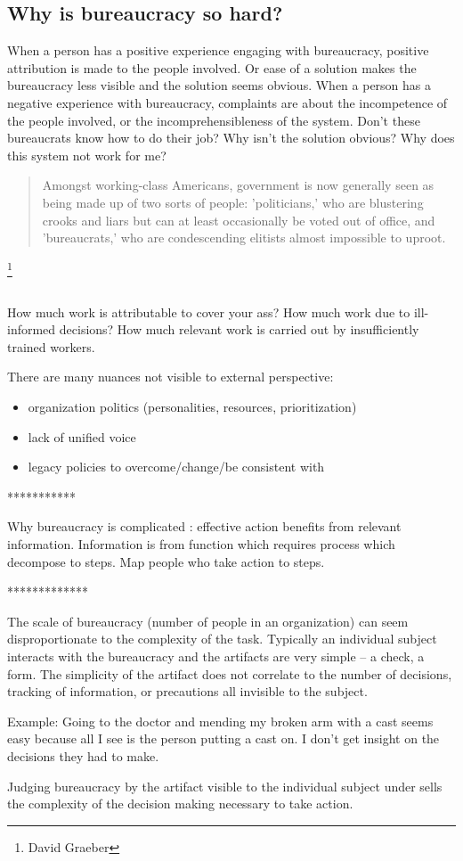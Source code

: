 \subsection{Why is bureaucracy so hard?}



When a person has a positive experience engaging with bureaucracy, positive attribution is made to the people involved. Or ease of a solution makes the bureaucracy less visible and the solution seems obvious. 
When a person has a negative experience with bureaucracy, complaints are about the incompetence of the people involved, or the incomprehensibleness of the system. Don't these bureaucrats know how to do their job? Why isn't the solution obvious? Why does this system not work for me?

\begin{quote}
 Amongst working-class Americans, government is now generally seen as being made up of two sorts of people: 'politicians,' who are blustering crooks and liars but can at least occasionally be voted out of office, and 'bureaucrats,' who are condescending elitists almost impossible to uproot.   
\end{quote}
\footnote{David Graeber}


\ \\


How much work is attributable to cover your ass? How much work due to ill-informed decisions? How much relevant work is carried out by insufficiently trained workers. 


There are many nuances not visible to external perspective:
\begin{itemize}
\item organization politics (personalities, resources, prioritization)
\item lack of unified voice
\item legacy policies to overcome/change/be consistent with
\end{itemize}

***********

Why bureaucracy is complicated : effective action benefits from relevant information. Information is from function which requires process which decompose to steps. Map people who take action to steps.

*************

The scale of bureaucracy (number of people in an organization) can seem disproportionate to the complexity of the task. Typically an individual subject interacts with the bureaucracy and the artifacts are very simple -- a check, a form. The simplicity of the artifact does not correlate to the number of decisions, tracking of information, or precautions all invisible to the subject.

Example: Going to the doctor and mending my broken arm with a cast seems easy because all I see is the person putting a cast on. I don't get insight on the decisions they had to make. 

Judging bureaucracy by the artifact visible to the individual subject under sells the complexity of the decision making necessary to take action.